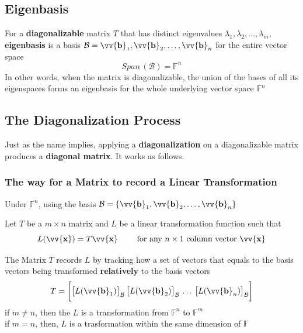 \documentclass[11pt]{article}
\DeclareRobustCommand{\myvec}[1]{\vv{\mathbf{#1}}}
\newcommand{\myset}[1]{\mathcal{#1}}
\newcommand{\mymat}[1]{#1}
\begin{document}
    \subsection{Eigenbasis}
    For a \textbf{diagonalizable} matrix $\mymat{T}$ that has distinct eigenvalues $\lambda_1, \lambda_2, \dots, \lambda_m$, \\
    \textbf{eigenbasis} is a basis $\myset{B} = \myvec{b}_1, \myvec{b}_2, \dots, \myvec{b}_n$ for the entire vector space
    \[ Span\,(\myset{B}) = \mathbb{F}^n \]
    In other words, when the matrix is diagonalizable, the union of the bases of all its eigenspaces forms 
    an eigenbasis for the whole underlying vector space $\mathbb{F}^n$
    
    \subsection{The Diagonalization Process}
    Just as the name implies, applying a \textbf{diagonalization} on a diagonalizable matrix produces a \textbf{diagonal matrix}. It works as follows.
    
    \subsubsection{The way for a Matrix to record a Linear Transformation}
    Under $\mathbb{F}^n$, using the basis $\myset{B} = \{ \myvec{b}_1, \myvec{b}_2, \dots, \myvec{b}_n \}$ \vspace{1ex}

    Let $T$ be a $m \times n$ matrix and $L$ be a linear transformation function such that
    \[ \mymat{L}(\myvec{x}) = \mymat{T}\myvec{x} \qquad \text{ for any }n \times 1\text{ column vector }\myvec{x} \]
    
    The Matrix $\mymat{T}$ records $\mymat{L}$ by tracking how a set of vectors that equals to the basis vectors being transformed \textbf{relatively} to the basis vectors \\
    
    \begin{equation}
        \mymat{T} = \bigg[ \big[\mymat{L}(\myvec{b}_1)\big]_{\myset{B}} \, \big[\mymat{L}(\myvec{b}_2)\big]_{\myset{B}} \, \dots \, \big[\mymat{L}(\myvec{b}_n)\big]_{\myset{B}} \bigg]
    \end{equation}
    if $m \ne n$, then the $\mymat{L}$ is a transformation from $\mathbb{F}^n$ to $\mathbb{F}^m$\\
    if $m = n$, then, $\mymat{L}$ is a trasformation within the same dimension of $\mathbb{F}$
    \vspace{1ex}
\end{document}
